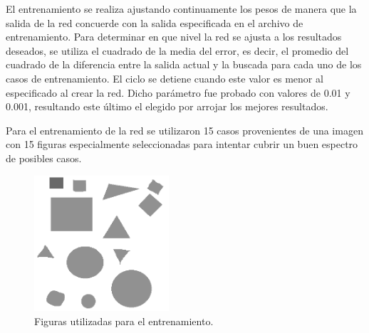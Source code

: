 \documentclass[pdftex,a4paper,10.5pt]{article}
\begin{document}
El entrenamiento se realiza ajustando continuamente los pesos de manera que 
la salida de la red  concuerde con la salida especificada en el archivo de entrenamiento. Para 
determinar en que nivel la red se ajusta a los resultados deseados, se utiliza el cuadrado de la media 
del error, es decir, el promedio del cuadrado de la diferencia entre la salida actual y la buscada para
cada uno de los casos de entrenamiento. El ciclo se detiene cuando este valor es menor al especificado
al crear la red. Dicho par\'ametro fue probado con valores de 0.01 y 0.001, resultando este \'ultimo el 
elegido por arrojar los mejores resultados.

Para el entrenamiento de la red se utilizaron 15 casos provenientes de una imagen con 15 figuras especialmente seleccionadas para intentar cubrir un buen espectro de posibles casos.
   
             \begin{figure}[H]
	                  \begin{center}
	                    \includegraphics[width=5cm]{prueba2.png}
	                    \caption{\label{entrenamiento} Figuras utilizadas para el entrenamiento. }
	                  \end{center}
	            \end{figure}



\end{document}
